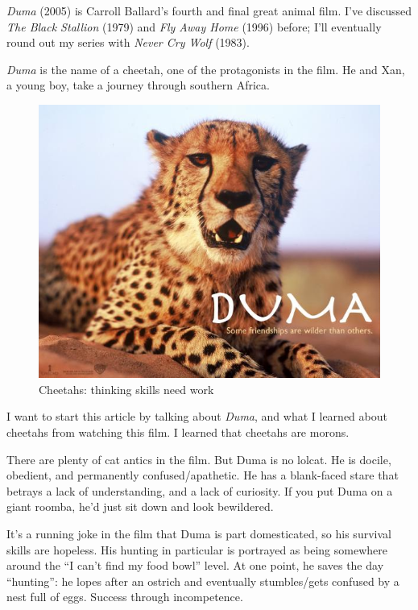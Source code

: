 
\textit{Duma} (2005) is Carroll Ballard's fourth and final great animal film. I've discussed \textit{The Black Stallion} (1979) and \textit{Fly Away Home} (1996) before; I'll eventually round out my series with \textit{Never Cry Wolf} (1983).

\textit{Duma} is the name of a cheetah, one of the protagonists in the film. He and Xan, a young boy, take a journey through southern Africa.

\begin{figure}
  \begin{center}
    \includegraphics[width=\textwidth]{content/assets/duma--1}
  \end{center}
  \caption{Cheetahs: thinking skills need work}
\end{figure}

I want to start this article by talking about \textit{Duma}, and what I learned about cheetahs from watching this film. I learned that cheetahs are morons.

There are plenty of cat antics in the film. But Duma is no lolcat. He is docile, obedient, and permanently confused/apathetic. He has a blank-faced stare that betrays a lack of understanding, and a lack of curiosity. If you put Duma on a giant roomba, he'd just sit down and look bewildered.

It's a running joke in the film that Duma is part domesticated, so his survival skills are hopeless. His hunting in particular is portrayed as being somewhere around the ``I can't find my food bowl'' level. At one point, he saves the day ``hunting'': he lopes after an ostrich and eventually stumbles/gets confused by a nest full of eggs. Success through incompetence.

